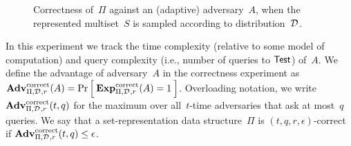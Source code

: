 \begin{figure}[htp]
\centering
{}
\caption{Correctness of~$\Pi$ against an (adaptive) adversary~$A$, when
  the represented multiset~$S$ is sampled according to distribution~$\mathcal{D}_{}^{}$.}
\label{fig:correctness}
\end{figure}

In this experiment we track the time complexity (relative to some
model of computation) and query complexity (i.e., number of
queries to $\mathsf{Test}$) of~$A$.
We define the advantage of adversary~$A$ in the correctness experiment as
$\mathrm{\mathbf{Adv}}^{\mathrm{correct}}_{\Pi,\mathcal{D}_{}^{},r}(A) = \Pr\left[\: \mathrm{\mathbf{Exp}}^{\mathrm{correct}}_{\Pi,\mathcal{D}_{}^{}, r}(A)=1 \:\right]$.
Overloading notation, we write $\mathrm{\mathbf{Adv}}^{\mathrm{correct}}_{\Pi,\mathcal{D}_{}^{},r}(t,q)$ for the maximum over
all~$t$-time adversaries that ask at most~$q$ queries. We say that a
set-representation data structure~$\Pi$ is $(t,q,r,\epsilon)$-correct if $\mathrm{\mathbf{Adv}}^{\mathrm{correct}}_{\Pi,\mathcal{D}_{}^{},r}(t,q) \leq \epsilon$.


